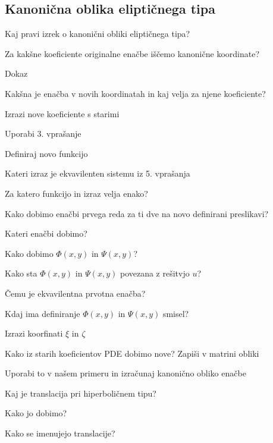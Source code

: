 \documentclass{article}
\begin{document}
    \subsection{Kanonična oblika eliptičnega tipa}
    \begin{enumerate}
        \item Kaj pravi izrek o kanonični obliki eliptičnega tipa?
        {\color{red}\item Za kakšne koeficiente originalne enačbe iščemo kanonične koordinate?}
        Dokaz
        \item Kakšna je enačba v novih koordinatah in kaj velja za njene koeficiente?
        \item Izrazi nove koeficiente s starimi
        \item Uporabi 3. vprašanje
        {\color{red}\item Definiraj novo funkcijo}
        {\color{red}\item Kateri izraz je ekvavilenten sistemu iz 5. vprašanja}
        {\color{red}\item Za katero funkcijo in izraz velja enako?}
        \item Kako dobimo enačbi prvega reda za ti dve na novo definirani preslikavi?
        \item Kateri enačbi dobimo?
        \item Kako dobimo $\Phi(x, y)$ in $\Psi(x ,y)$?
        {\color{red}\item Kako sta $\Phi(x, y)$ in $\Psi(x ,y)$ povezana z rešitvjo $u$?}
        {\color{red}\item Čemu je ekvavilentna prvotna enačba?}
        {\color{red}\item Kdaj ima definiranje $\Phi(x, y)$ in $\Psi(x ,y)$ smisel?}
        \item Izrazi koorfinati $\xi$ in $\zeta$
        {\color{red}\item Kako iz starih koeficientov PDE dobimo nove? Zapiši v matrini obliki}
        {\color{red}\item Uporabi to v našem primeru in izračunaj kanonično obliko enačbe}
        {\color{red}\item Kaj je translacija pri hiperboličnem tipu?}
        {\color{red}\item Kako jo dobimo?}
        {\color{red}\item Kako se imenujejo translacije?}
    \end{enumerate}
\end{document}
